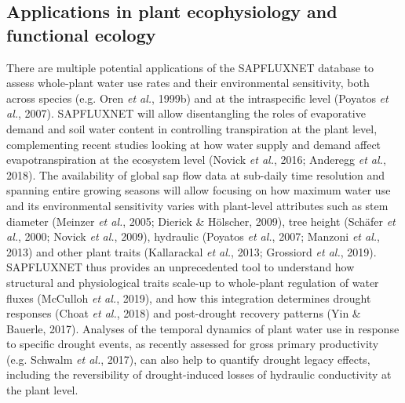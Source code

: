 \documentclass[11pt,twoside]{reedthesis}
\begin{document}
\subsection{Applications in plant ecophysiology and functional
ecology}\label{applications-in-plant-ecophysiology-and-functional-ecology}

There are multiple potential applications of the SAPFLUXNET database to
assess whole-plant water use rates and their environmental sensitivity,
both across species (e.g. Oren \emph{et al.}, 1999b) and at the
intraspecific level (Poyatos \emph{et al.}, 2007). SAPFLUXNET will allow
disentangling the roles of evaporative demand and soil water content in
controlling transpiration at the plant level, complementing recent
studies looking at how water supply and demand affect evapotranspiration
at the ecosystem level (Novick \emph{et al.}, 2016; Anderegg \emph{et
al.}, 2018). The availability of global sap flow data at sub-daily time
resolution and spanning entire growing seasons will allow focusing on
how maximum water use and its environmental sensitivity varies with
plant-level attributes such as stem diameter (Meinzer \emph{et al.},
2005; Dierick \& Hölscher, 2009), tree height (Schäfer \emph{et al.},
2000; Novick \emph{et al.}, 2009), hydraulic (Poyatos \emph{et al.},
2007; Manzoni \emph{et al.}, 2013) and other plant traits (Kallarackal
\emph{et al.}, 2013; Grossiord \emph{et al.}, 2019). SAPFLUXNET thus
provides an unprecedented tool to understand how structural and
physiological traits scale-up to whole-plant regulation of water fluxes
(McCulloh \emph{et al.}, 2019), and how this integration determines
drought responses (Choat \emph{et al.}, 2018) and post-drought recovery
patterns (Yin \& Bauerle, 2017). Analyses of the temporal dynamics of
plant water use in response to specific drought events, as recently
assessed for gross primary productivity (e.g. Schwalm \emph{et al.},
2017), can also help to quantify drought legacy effects, including the
reversibility of drought-induced losses of hydraulic conductivity at the
plant level.\par
\end{document}
